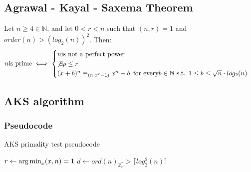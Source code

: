 \subsection{Agrawal - Kayal - Saxema Theorem}
\begin{theorem}\label{aks_theorem}
    Let $n \geq 4 \in \mathbb{N}$, and let $0 < r < n$ such that $(n,r) = 1$ and $order(n) > (log_{2}(n))^{2}$. Then:
    \[
    n \text{is prime} \iff
         \begin{cases}
           n \text{is not a perfect power} \\
           \not\exists p \leq r \\
           (x + b)^{n} \equiv_{(n, x^{r} - 1)} x^{n} + b \text{\, for every} b \in \mathbb{N} \text{ s.t. } 1 \leq b \leq \sqrt{n} \cdot log_{2}(n)
         \end{cases}
    \]
\end{theorem}

\subsection{AKS algorithm}
\subsubsection{Pseudocode}
\begin{algorithm}
    \caption{AKS primality test pseudocode}\label{alg:aks_pscd_ptest}
    $r \gets \operatorname*{arg\,min}_{x} (x,n) = 1$\;
    $d \gets ord(n)_{\mathbb{Z}_{r}^{*}} > \lceil log_{2}^{2}(n) \rceil$\;
    \label{step_3_aks}
    \label{step_5_aks}
    \;
\end{algorithm}

